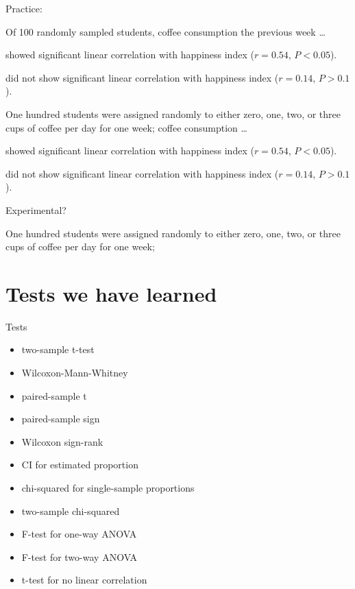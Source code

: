\begin{frame}{Practice:}

    \vspace{1em}

    Of 100 randomly sampled students,
    coffee consumption the previous week
    \ldots
    \vspace{1em}

    showed significant linear correlation 
    with happiness index ($r=0.54$, $P<0.05$).
    \vspace{1em}

    \alert{did not} show significant linear correlation 
    with happiness index ($r=0.14$, $P>0.1$).
    \vfill


    One hundred students were assigned randomly
    to either zero, one, two, or three cups of coffee per day
    for one week;
    coffee consumption 
    \ldots
    \vspace{1em}

    showed significant linear correlation 
    with happiness index ($r=0.54$, $P<0.05$).
    \vspace{1em}

    \alert{did not} show significant linear correlation 
    with happiness index ($r=0.14$, $P>0.1$).
    \vfill

\end{frame}

\begin{frame}{Experimental?}

    One hundred students were assigned randomly
    to either zero, one, two, or three cups of coffee per day
    for one week;

\end{frame}

\section{Tests we have learned}

\begin{frame}{Tests}

  \begin{itemize}
    \item two-sample t-test
    \item Wilcoxon-Mann-Whitney
    \item paired-sample t
    \item paired-sample sign
    \item Wilcoxon sign-rank
    \item CI for estimated proportion
    \item chi-squared for single-sample proportions
    \item two-sample chi-squared
    \item F-test for one-way ANOVA
    \item F-test for two-way ANOVA
    \item t-test for no linear correlation
  \end{itemize}

\end{frame}

